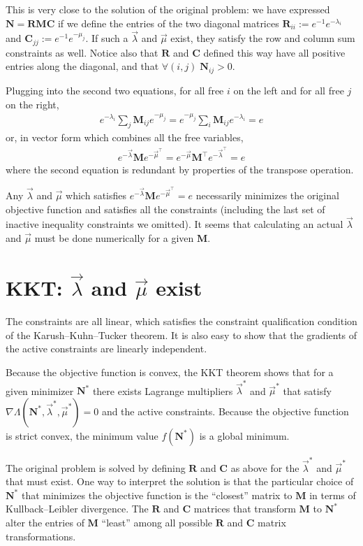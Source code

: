 \documentclass[10pt,a4paper]{article}
\newcommand{\matr}[1]{\mathbf{#1}} %
\newcommand{\tr}[0]{{\intercal}}
\begin{document}
This is very close to the solution 
of the original problem: we have expressed 
$\matr{N} = \matr{R}\matr{M}\matr{C}$
if we define the entries of the two diagonal matrices 
$\matr{R}_{ii} := e^{-1}e^{-\lambda_i}$
and $\matr{C}_{jj} := e^{-1}e^{-\mu_j}$.
If such a $\vec{\lambda}$ and $\vec{\mu}$ exist,
they satisfy the row and column sum constraints as well.
Notice also that $\matr{R}$ and $\matr{C}$ defined this way have all positive entries along the diagonal,
and that $\forall (i,j) \; \matr{N}_{ij} > 0$.

Plugging into the second two equations, for all free $i$ on the left and for all free $j$ on the right,
\begin{align*}
e^{-\lambda_i} \sum_j \matr{M}_{ij} e^{-\mu_j}
= e^{-\mu_j} \sum_i \matr{M}_{ij} e^{-\lambda_i}
= e
\end{align*}
or, in vector form which combines all the free variables,
\begin{align*}
e^{-\vec{\lambda}} \matr{M} e^{-\vec{\mu}^\tr}
= e^{-\vec{\mu}} \matr{M^\tr} e^{-\vec{\lambda}^\tr}
= e
\end{align*}
where the second equation is redundant by properties of the transpose operation.

Any $\vec{\lambda}$ and $\vec{\mu}$ which satisfies $e^{-\vec{\lambda}} \matr{M} e^{-\vec{\mu}^\tr} = e$
necessarily minimizes the original objective function and satisfies all the constraints
(including the last set of inactive inequality constraints we omitted). 
It seems that calculating an actual $\vec{\lambda}$ and $\vec{\mu}$ 
must be done numerically for a given $\matr{M}$.

\section{KKT: $\vec{\lambda}$ and $\vec{\mu}$ exist}
The constraints are all linear, which satisfies the 
constraint qualification condition of the Karush–Kuhn–Tucker theorem.
It is also easy to show that the gradients of the active constraints are linearly independent.

Because the objective function is convex, the KKT theorem shows 
that for a given minimizer $\matr{N}^*$ 
there exists Lagrange multipliers $\vec{\lambda}^*$ and $\vec{\mu}^*$ 
that satisfy  $\nabla \Lambda(\matr{N}^*,\vec{\lambda}^*, \vec{\mu}^*) = 0$
and the active constraints.
Because the objective function is strict convex, the minimum value 
$f(\matr{N}^*)$ is a global minimum.

The original problem is solved by defining $\matr{R}$ and $\matr{C}$ as above
for the $\vec{\lambda}^*$ and $\vec{\mu}^*$ that must exist.
One way to interpret the solution is that the particular choice of $\matr{N}^*$
that minimizes the objective function is the ``closest'' matrix to $\matr{M}$
in terms of Kullback–Leibler divergence.
The $\matr{R}$ and $\matr{C}$ matrices that transform $\matr{M}$ to $\matr{N}^*$
alter the entries of $\matr{M}$ ``least'' among all possible 
$\matr{R}$ and $\matr{C}$ matrix transformations.

%
%
\end{document}
